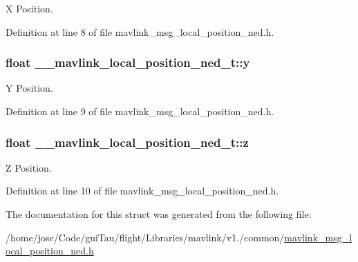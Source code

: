 X Position. 



Definition at line 8 of file mavlink\-\_\-msg\-\_\-local\-\_\-position\-\_\-ned.\-h.

\hypertarget{struct____mavlink__local__position__ned__t_a56754cbe34638a9f6b5adca9ecf7fb44}{
\subsubsection[{y}]{\setlength{\rightskip}{0pt plus 5cm}float \-\_\-\-\_\-mavlink\-\_\-local\-\_\-position\-\_\-ned\-\_\-t\-::y}}\label{struct____mavlink__local__position__ned__t_a56754cbe34638a9f6b5adca9ecf7fb44}


Y Position. 



Definition at line 9 of file mavlink\-\_\-msg\-\_\-local\-\_\-position\-\_\-ned.\-h.

\hypertarget{struct____mavlink__local__position__ned__t_a4fc3fd6b6974b6b2356e4a7e28f9fecd}{
\subsubsection[{z}]{\setlength{\rightskip}{0pt plus 5cm}float \-\_\-\-\_\-mavlink\-\_\-local\-\_\-position\-\_\-ned\-\_\-t\-::z}}\label{struct____mavlink__local__position__ned__t_a4fc3fd6b6974b6b2356e4a7e28f9fecd}


Z Position. 



Definition at line 10 of file mavlink\-\_\-msg\-\_\-local\-\_\-position\-\_\-ned.\-h.



The documentation for this struct was generated from the following file\-:\begin{DoxyCompactItemize}
\item 
/home/jose/\-Code/gui\-Tau/flight/\-Libraries/mavlink/v1./common/\hyperlink{mavlink__msg__local__position__ned_8h}{mavlink\-\_\-msg\-\_\-local\-\_\-position\-\_\-ned.\-h}\end{DoxyCompactItemize}
